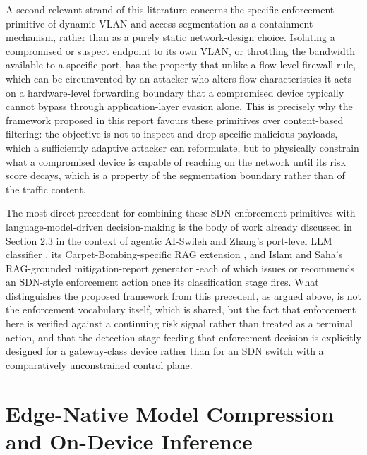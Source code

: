 A second relevant strand of this literature concerns the specific enforcement primitive of dynamic VLAN and access segmentation as a containment mechanism, rather than as a purely static network-design choice. Isolating a compromised or suspect endpoint to its own VLAN, or throttling the bandwidth available to a specific port, has the property that-unlike a flow-level firewall rule, which can be circumvented by an attacker who alters flow characteristics-it acts on a hardware-level forwarding boundary that a compromised device typically cannot bypass through application-layer evasion alone. This is precisely why the framework proposed in this report favours these primitives over content-based filtering: the objective is not to inspect and drop specific malicious payloads, which a sufficiently adaptive attacker can reformulate, but to physically constrain what a compromised device is capable of reaching on the network until its risk score decays, which is a property of the segmentation boundary rather than of the traffic content.

The most direct precedent for combining these SDN enforcement primitives with language-model-driven decision-making is the body of work already discussed in Section 2.3 in the context of agentic AI-Swileh and Zhang's port-level LLM classifier \cite{Swileh2025}, its Carpet-Bombing-specific RAG extension \cite{Swileh2026}, and Islam and Saha's RAG-grounded mitigation-report generator \cite{IslamSaha2026}-each of which issues or recommends an SDN-style enforcement action once its classification stage fires. What distinguishes the proposed framework from this precedent, as argued above, is not the enforcement vocabulary itself, which is shared, but the fact that enforcement here is verified against a continuing risk signal rather than treated as a terminal action, and that the detection stage feeding that enforcement decision is explicitly designed for a gateway-class device rather than for an SDN switch with a comparatively unconstrained control plane.

\section{Edge-Native Model Compression and On-Device Inference}

